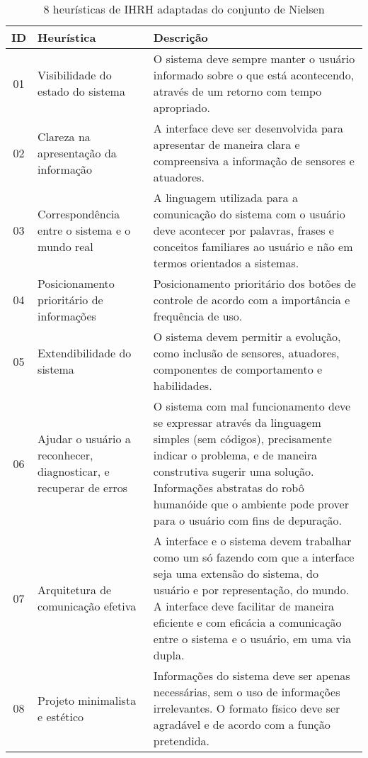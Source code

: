 \begin{table}[!ht]
	\caption{8 heurísticas de IHRH adaptadas do conjunto de Nielsen}
	\label{tab:heuristicasfutebol}
	\centering
	\begin{tabular}{ c | m{4cm} | m{10cm} }
		\hline
		ID & Heurística & Descrição \\
		\hline
        01 & Visibilidade do estado do sistema & O sistema deve sempre manter o usuário informado sobre o que está acontecendo, através de um retorno com tempo apropriado. \\
		\hline
        02 & Clareza na apresentação da informação & A interface deve ser desenvolvida para apresentar de maneira clara e compreensiva a informação de sensores e atuadores. \\
		\hline
        03 & Correspondência entre o sistema e o mundo real & A linguagem utilizada para a comunicação do sistema com o usuário deve acontecer por palavras, frases e conceitos familiares ao usuário e não em termos orientados a sistemas. \\
		\hline
        04 & Posicionamento prioritário de informações & Posicionamento prioritário dos botões de controle de acordo com a importância e frequência de uso. \\
		\hline
        05 & Extendibilidade do sistema & O sistema devem permitir a evolução, como inclusão de sensores, atuadores, componentes de comportamento e habilidades. \\
		\hline
        06 & Ajudar o usuário a reconhecer, diagnosticar, e recuperar de erros & O sistema com mal funcionamento deve se expressar através da linguagem simples (sem códigos), precisamente indicar o problema, e de maneira construtiva sugerir uma solução. Informações abstratas do robô humanóide que o ambiente pode prover para o usuário com fins de depuração. \\
		\hline
        07 & Arquitetura de comunicação efetiva & A interface e o sistema devem trabalhar como um só fazendo com que a interface seja uma extensão do sistema, do usuário e por representação, do mundo. A interface deve facilitar de maneira eficiente e com eficácia a comunicação entre o sistema e o usuário, em uma via dupla. \\
		\hline
        08 & Projeto minimalista e estético & Informações do sistema deve ser apenas necessárias, sem o uso de informações irrelevantes. O formato físico deve ser agradável e de acordo com a função pretendida. \\
		\hline
	\end{tabular}
\end{table}

